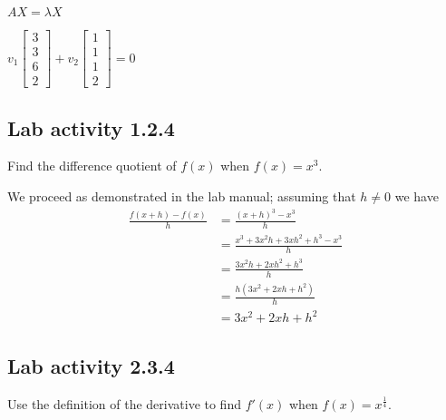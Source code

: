 \documentclass{article}
\theoremstyle{definition}
\begin{document}
$AX=\lambda X$

$v_1 \begin{bmatrix}
  3\\3\\6\\2
\end{bmatrix}
+
v_2 \begin{bmatrix}
  1\\1\\1\\2
\end{bmatrix}
= 0
$







\subsection*{Lab activity 1.2.4}
Find the difference quotient of $f(x)$ when $f(x)=x^3$.

We proceed as demonstrated in the lab manual; assuming that $h\ne 0$ 
we have
\begin{align*}
    \frac{f(x+h)-f(x)}{h} & =  \frac{(x+h)^3-x^3}{h}   \\
                          & =  \frac{x^3+3x^2h+3xh^2+h^3 - x^3}{h}\\
                          & =  \frac{3x^2h+2xh^2+h^3}{h}\\
                          & =  \frac{h(3x^2+2xh+h^2)}{h}\\
                          & =  3x^2+2xh+h^2
\end{align*} 

\subsection*{Lab activity 2.3.4}
Use the definition of the derivative to find $f'(x)$ when $f(x)=x^{\frac{1}{4}}$.
\end{document}
